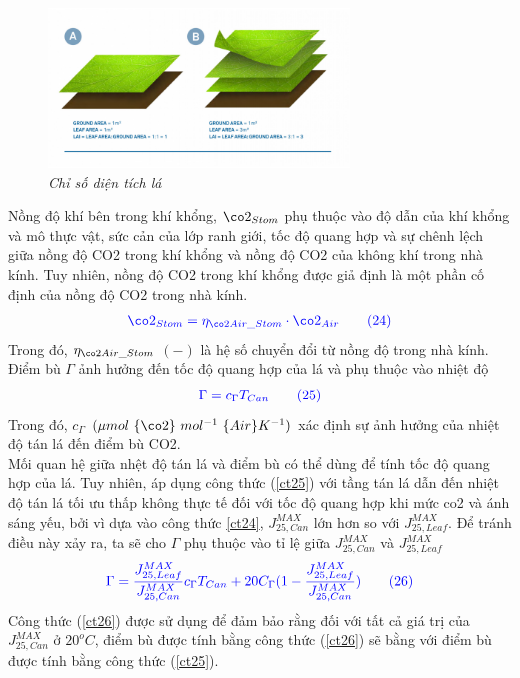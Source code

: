\documentclass[13pt,a4paper]{article}
\begin{document}
			\begin{figure}[h!]
				\begin{center}
					\includegraphics[width=8cm]{lai.png}
					\caption{\textit{Chỉ số diện tích lá}}
					\label{h16}
				\end{center}
			\end{figure} 
			\newpage
			Nồng độ khí  bên trong khí khổng, $\co2_{Stom}$ phụ thuộc vào độ dẫn của khí khổng và mô thực vật, sức cản của lớp ranh giới, tốc độ quang hợp và sự chênh lệch giữa nồng độ CO2 trong khí khổng và nồng độ CO2 của không khí trong nhà kính. Tuy nhiên, nồng độ CO2 trong khí khổng được giả định là một phần cố định của nồng độ CO2 trong nhà kính.
			\begin{align}
				\color{blue}
					\co2_{Stom} = \eta_{\co2 Air\_Stom} \cdot \co2_{Air}
				\color{blue}
				\tag{24} \label{ct24}
			\end{align}
			Trong đó, $\eta_{\co2 Air\_Stom}$ $(-)$ là hệ số chuyển đổi từ nồng độ  trong nhà kính. \\
			Điểm bù  $\Gamma$ ảnh hưởng đến tốc độ quang hợp của lá và phụ thuộc vào nhiệt độ
			\begin{align}
				\color{blue}
					\Gamma = c_{\Gamma}T_{Can}
				\color{blue}
				\tag{25} \label{ct25}
			\end{align}
			Trong đó, $c_{\Gamma}$ $(\mu mol\ \{\co2\}\ mol^{-1}\ \{Air\} K^{-1})$ xác định sự ảnh hưởng của nhiệt độ tán lá đến điểm bù CO2. \\
			Mối quan hệ giữa nhệt độ tán lá và điểm bù  có thể dùng để tính tốc độ quang hợp của lá. Tuy nhiên, áp dụng công thức (\ref{ct25}) với tầng tán lá dẫn đến nhiệt độ tán lá tối ưu thấp không thực tế đối với tốc độ quang hợp khi mức co2 và ánh sáng yếu, bởi vì dựa vào công thức \ref{ct24}, $J^{MAX}_{25,Can}$ lớn hơn so với $J^{MAX}_{25,Leaf}$. Để tránh điều này xảy ra, ta sẽ cho $\Gamma$ phụ thuộc vào tỉ lệ giữa $J^{MAX}_{25,Can}$ và $J^{MAX}_{25,Leaf}$
			\begin{align}
				\color{blue}
					\Gamma = \dfrac{J^{MAX}_{25,Leaf}}{J^{MAX}_{25,Can}}c_{\Gamma}T_{Can} + 20C_{\Gamma} (1 - \dfrac{J^{MAX}_{25,Leaf}}{J^{MAX}_{25,Can}})
				\color{blue}
				\tag{26} \label{ct26}
			\end{align}
			Công thức (\ref{ct26}) được sử dụng để đảm bảo rằng đối với tất cả giá trị của $J^{MAX}_{25,Can}$ ở $20^oC$, điểm bù được tính bằng công thức (\ref{ct26}) sẽ bằng với điểm bù được tính bằng công thức (\ref{ct25}).
			
\end{document}
